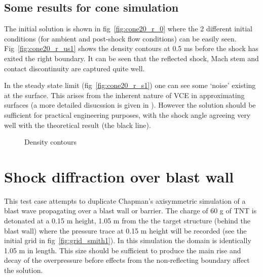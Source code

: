 \documentclass[pdftex, 12pt, a4paper]{report}
\begin{document}
\subsection{Some results for cone simulation}\label{sec:cone_results}

The initial solution is shown in fig~\ref{fig:cone20_r_0} where the 2 different initial conditions (for ambient and post-shock
flow conditions) can be easily seen.  Fig~\ref{fig:cone20_r_us1} shows the density contours at 0.5 ms before the shock has exited
the right boundary.  It can be seen that the reflected shock, Mach stem and contact discontinuity are captured quite well.

In the steady state limit (fig~\ref{fig:cone20_r_s1}) one can see some `noise' existing at the surface.  This arises from the inherent 
nature of VCE
in approximating surfaces (a more detailed disucssion is given in \cite{Tang:asm}).  However the solution should be sufficient for
practical engineering purposes, with the shock angle agreeing very well with the theoretical result (the black line).

\begin{figure}[htp]
  	\centering
	\caption{Density contours}
	\label{fig:VCE_20_deg_unsteady}
\end{figure}
\pagebreak

\section{Shock diffraction over blast wall}\label{sec:smith_barrier}

This test case attempts to duplicate Chapman's \cite{Chapman:bw} axisymmetric simulation of a blast wave propagating over a blast wall or
barrier.  The charge of 60 g of TNT is detonated at a 0.15 m height, 1.05 m from the the target structure (behind the blast wall) where
the pressure trace at 0.15 m height will be recorded (see the initial grid in fig~\ref{fig:grid_smith1}).  In this
simulation the domain is identically 1.05 m in length.  This size should be sufficient to produce the main rise and decay of 
the overpressure before effects from the non-reflecting boundary affect the solution.
\end{document}
